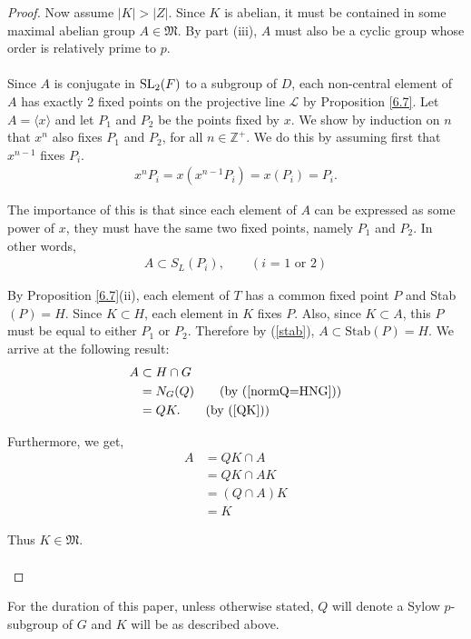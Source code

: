 \begin{proof}
Now assume $|K| > |Z|$. Since $K$ is abelian, it must be contained in some maximal abelian group $A \in \mathfrak{M}$. By part (iii), $A$ must also be a cyclic group whose order is relatively prime to $p$. \\
\\
Since $A$ is conjugate in $\operatorname{SL}_2(F)$ to a subgroup of $D$, each non-central element of $A$ has exactly 2 fixed points on the projective line $\mathscr{L}$ by Proposition \ref{6.7}. Let $A = \langle x \rangle$ and let $P_1$ and $P_2$ be the points fixed by $x$. We show by induction on $n$ that $x^n$ also fixes $P_1$ and $P_2$, for all $n \in \mathbb{Z^+}$. We do this by assuming first that $x^{n-1}$ fixes $P_i$.
\begin{align*} x^n P_i = x(x^{n-1} P_i) = x (P_i) = P_i.
\end{align*}

The importance of this is that since each element of $A$ can be expressed as some power of $x$, they must have the same two fixed points, namely $P_1$ and $P_2$. In other words, 
\begin{align}\label{stab} A \subset S_L(P_i), \qquad (\text{$i$ = 1 or 2})
\end{align}

By Proposition \ref{6.7}(ii), each element of $T$ has a common fixed point $P$ and Stab$(P) = H$. Since $K \subset H$, each element in $K$ fixes $P$. Also, since $K \subset A$, this $P$ must be equal to either $P_1$ or $P_2$. Therefore by (\ref{stab}), $A \subset \text{Stab}(P) = H$. We arrive at the following result:
\begin{align*} A &\subset H \cap G 
\\ &= N_G(Q) \tag{by (\ref{normQ=HNG})}
\\ &= QK. \tag{by (\ref{QK})}
\end{align*}

Furthermore, we get,
\begin{align*} A &= QK \cap A
\\ &= QK \cap AK \tag{$K \subset A$ so $A = AK$}
\\ &= (Q \cap A)K
\\ &= K \tag{$Q \cap A = I_G$}
\end{align*}

Thus $K \in \mathfrak{M}$. \\
\\
\end{proof}

For the duration of this paper, unless otherwise stated, $Q$ will denote a Sylow $p$-subgroup of $G$ and $K$ will be as described above. 


